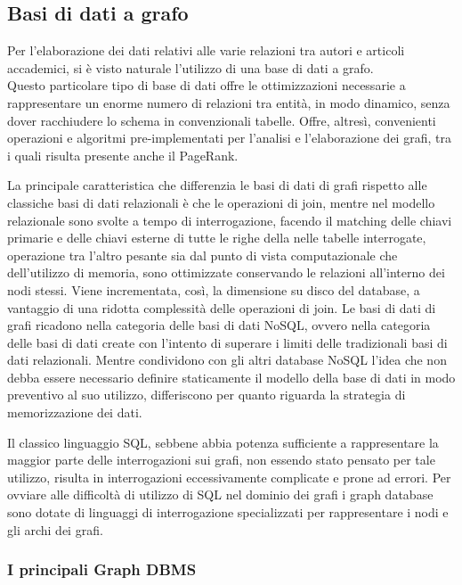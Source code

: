\documentclass[a4paper, 12pt]{article}
\begin{document}
\subsection{Basi di dati a grafo}
Per l'elaborazione dei dati relativi alle varie relazioni tra autori e articoli accademici, si è visto naturale l'utilizzo di una base di dati a grafo. \\
Questo particolare tipo di base di dati offre le ottimizzazioni necessarie a rappresentare un enorme numero di relazioni tra entità, in modo dinamico, senza dover racchiudere lo schema in convenzionali tabelle. Offre, altresì, convenienti operazioni e algoritmi pre-implementati per l'analisi e l'elaborazione dei grafi, tra i quali risulta presente anche il PageRank.
\par
La principale caratteristica che differenzia le basi di dati di grafi rispetto alle classiche basi di dati relazionali è che le operazioni di join, mentre nel modello relazionale sono svolte a tempo di interrogazione, facendo il matching delle chiavi primarie e delle chiavi esterne di tutte le righe della nelle tabelle interrogate, operazione tra l'altro pesante sia dal punto di vista computazionale che dell'utilizzo di memoria, sono ottimizzate conservando le relazioni all'interno dei nodi stessi. Viene incrementata, così, la dimensione su disco del database, a vantaggio di una ridotta complessità delle operazioni di join.
Le basi di dati di grafi ricadono nella categoria delle basi di dati NoSQL, ovvero nella categoria delle basi di dati create con l'intento di superare i limiti delle tradizionali basi di dati relazionali. Mentre condividono con gli altri database NoSQL l'idea che non debba essere necessario definire staticamente il modello della base di dati in modo preventivo al suo utilizzo, differiscono per quanto riguarda la strategia di memorizzazione dei dati.
\par
Il classico linguaggio SQL, sebbene abbia potenza sufficiente a rappresentare la maggior parte delle interrogazioni sui grafi, non essendo stato pensato per tale utilizzo, risulta in interrogazioni eccessivamente complicate e prone ad errori. Per ovviare alle difficoltà di utilizzo di SQL nel dominio dei grafi i graph database sono dotate di linguaggi di interrogazione specializzati per rappresentare i nodi e gli archi dei grafi.

\subsubsection{I principali Graph DBMS}
\end{document}
